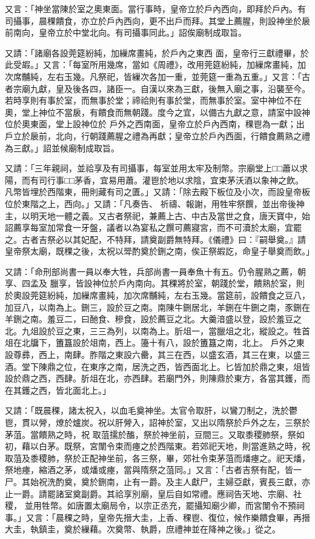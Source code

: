 \begin{pinyinscope}
 又言：「神坐當陳於室之奧東面。當行事時，皇帝立於戶內西向，即拜於戶內。有司攝事，晨稞饋食，亦立於戶內西向，更不出戶而拜。其堂上薦腥，則設神坐於扆前南向，皇帝立於中堂北向。有司攝事同此。」詔俟廟制成取旨。



 又請：「諸廟各設莞筵紛純，加繅席畫純，於戶內之東西
 面，皇帝行三獻禮畢，於此受嘏。」又言：「每室所用幾席，當如《周禮》，改用莞筵紛純，加繅席畫純，加次席黼純，左右玉幾。凡祭祀，皆繅次各加一重，並莞筵一重為五重。」又言：「古者宗廟九獻，皇及後各四，諸臣一。自漢以來為三獻，後無入廟之事，沿襲至今。若時享則有事於室，而無事於堂；禘祫則有事於堂，而無事於室。室中神位不在奧，堂上神位不當扆，有饋食而無朝踐。度今之宜，以備古九獻之意，請室中設神位於奧東面，堂上設神位於
 戶外之西南面，皇帝立於戶內西南，稞鬯為一獻；出戶立於扆前，北向，行朝踐薦腥之禮為再獻；皇帝立於戶內西面，行饋食薦熟之禮為三獻。」詔並候廟制成取旨。



 又請：「三年親祠，並祫享及有司攝事，每室並用太牢及制幣。宗廟堂上□□蕭以求陽，而有司行事□□茅香，宜易用蕭。灌鬯於地以求陰，宜束茅沃酒以象神之飲。凡幣皆埋於西階東，冊則藏有司之匱。」又請：「除去殿下板位及小次，而設皇帝板位於東階之上，西向。」又請：「凡奏告、
 祈禱、報謝，用牲牢祭饌，並出帝後神主，以明天地一體之義。又古者祭祀，兼薦上古、中古及當世之食，唐天寶中，始詔薦享每室加常食一牙盤，議者以為宴私之饌可薦寢宮，而不可瀆於太廟，宜罷之。古者吉祭必以其妃配，不特拜，請奠副爵無特拜。《儀禮》曰：『嗣舉奠。』請皇帝祭太廟，既稞之後，太祝以斝酌奠於鉶之南，俟正祭嘏訖，命皇子舉奠而飲。」



 又請：「命刑部尚書一員以奉大牲，兵部尚書一員奉魚十有五。仍令腥熟之薦，朝享、四孟及
 臘享，皆設神位於戶內南向。其稞將於室，朝踐於堂，饋熟於室，則於奧設莞筵紛純，加繅席畫純，加次席黼純，左右玉幾。當筵前，設饋食之豆八，加豆八，以南為上。鉶三，設於豆之南。南陳牛鉶居北，羊鉶在牛鉶之南，豕鉶在羊鉶之南。羞豆二，曰酏食、糝食，設於薦豆之北。大羹湆盛以登，設於羞豆之北。九俎設於豆之東，三三為列，以南為上。肵俎一，當臘俎之北，縱設之。牲首俎在北牖下，簠簋設於俎南，西上。籩十有八，設於簠簋之南，北上。
 戶外之東設尊彞，西上，南肆。胙階之東設六罍，其三在西，以盛玄酒，其三在東，以盛三酒。堂下陳鼎之位，在東序之南，居洗之西，皆西面北上。匕皆加於鼎之東，俎皆設於鼎之西，西肆。肵俎在北，亦西肆。若廟門外，則陳鼎於東方，各當其鑊，而在其鑊之西，皆北面北上。」



 又請：「既晨稞，諸太祝入，以血毛奠神坐。太官令取肝，以鸞刀制之，洗於鬱鬯，貫以膋，燎於爐炭。祝以肝膋入，詔神於室，又出以隋祭於戶外之左，三祭於茅菹。當饋熟之時，祝
 取菹擩於醢，祭於神坐前，豆間三。又取黍稷肺祭，祭如初，藉以白茅。既祭，宮闈令束而瘞之於西階東。若郊祀天地，則當進熟之時，祝取菹及黍稷肺，祭於正配神坐前，各三祭，畢，郊社令束茅菹而燔瘞之。祀天燔，祭地瘞，縮酒之茅，或燔或瘞，當與隋祭之菹同。」又言：「古者吉祭有配，皆一尸。其始祝洗酌奠，奠於鉶南，止有一爵。及主人獻尸，主婦亞獻，賓長三獻，亦止一爵。請罷諸室奠副爵。其祫享別廟，皇后自如常禮。應祠告天地、宗廟、社稷，
 並用牲幣。如唐置太廟局令，以宗正丞充，罷攝知廟少卿，而宮闈令不預祠事。」又言：「晨稞之時，皇帝先搢大圭，上香、稞鬯、復位，候作樂饋食畢，再搢大圭，執鎮圭，奠於繅藉。次奠幣、執爵，庶禮神並在降神之後。」從之。




\end{pinyinscope}
